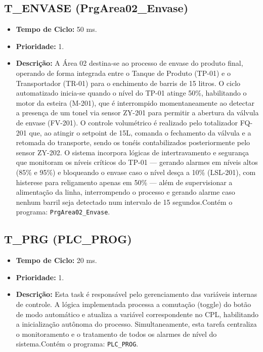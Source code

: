 \subsection{T\_ENVASE (PrgArea02\_Envase)}
\begin{itemize}
    \item \textbf{Tempo de Ciclo:} 50 ms.
    \item \textbf{Prioridade:} 1.
    \item \textbf{Descrição:}
A Área 02 destina-se ao processo de envase do produto final, operando de forma integrada entre o Tanque de Produto (TP-01) e o Transportador (TR-01) para o enchimento de barris de 15 litros. O ciclo automatizado inicia-se quando o nível do TP-01 atinge 50\%, habilitando o motor da esteira (M-201), que é interrompido momentaneamente ao detectar a presença de um tonel via sensor ZY-201 para permitir a abertura da válvula de envase (FV-201). O controle volumétrico é realizado pelo totalizador FQ-201 que, ao atingir o setpoint de 15L, comanda o fechamento da válvula e a retomada do transporte, sendo os tonéis contabilizados posteriormente pelo sensor ZY-202. O sistema incorpora lógicas de intertravamento e segurança que monitoram os níveis críticos do TP-01 — gerando alarmes em níveis altos (85\% e 95\%) e bloqueando o envase caso o nível desça a 10\% (LSL-201), com histerese para religamento apenas em 50\% — além de supervisionar a alimentação da linha, interrompendo o processo e gerando alarme caso nenhum barril seja detectado num intervalo de 15 segundos.Contém o programa: \texttt{PrgArea02\_Envase}.
\end{itemize}
\subsection{T\_PRG (PLC\_PROG)}
\begin{itemize}
    \item \textbf{Tempo de Ciclo:} 20 ms.
    \item \textbf{Prioridade:} 1.
    \item \textbf{Descrição:}
    Esta task é responsável pelo gerenciamento das variáveis internas de controle. A lógica implementada processa a comutação (toggle) do botão de modo automático e atualiza a variável correspondente no CPL, habilitando a inicialização autônoma do processo. Simultaneamente, esta tarefa centraliza o monitoramento e o tratamento de todos os alarmes de nível do sistema.Contém o programa: \texttt{PLC\_PROG}.
\end{itemize}
